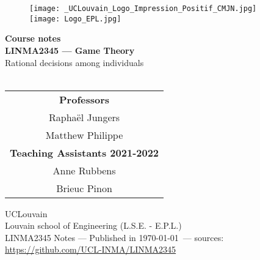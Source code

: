 \ifx \globalmark \undefined %

\else
\fi



\begin{titlepage}
\begin{center}



\vfill

\begin{figure}[!ht]
  \centering
  \texttt{[image: \_UCLouvain\_Logo\_Impression\_Positif\_CMJN.jpg]}
  \hfill
  \texttt{[image: Logo\_EPL.jpg]}
\end{figure}







{ \bfseries Course notes }
\hrulefill\\[0.5cm]
\large{\textbf{LINMA2345 --- Game Theory}\\
Rational decisions among individuals} \\
\hrulefill\\[0.5cm]


\vfill
\vfill
\parbox[H][][c]{\textwidth}
	{\centering
	\begin{tabular}{c}
	\textbf{Professors}\\
	  Rapha\"el Jungers\\ Matthew Philippe\\
	\textbf{Teaching Assistants 2021-2022}\\
	 Anne Rubbens\\ Brieuc Pinon
	\end{tabular}
	}\par




UCLouvain\\
Louvain school of Engineering (L.S.E. - E.P.L.)\\
$\,$\\
\tiny{LINMA2345 Notes --- Published in \monthyeardate\today $\,$ --- sources: \url{https://github.com/UCL-INMA/LINMA2345}}
\end{center}

\end{titlepage}







